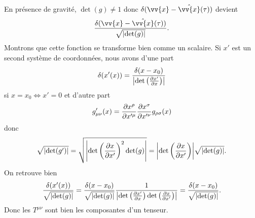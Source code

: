 \documentclass[a4paper,11pt]{report}
\begin{document}
\begin{exmp}
                En présence de gravité, $\det(g)\neq 1$ donc $\delta(\vv{x}-\hat{\vv{x}}(\tau))$ devient
                \begin{equation} \frac{\delta(\vv{x}-\hat{\vv{x}}(\tau))}{\sqrt{\abs{\det(g)}}}.
                \end{equation}
                Montrons que cette fonction se transforme bien comme un scalaire. Si $x'$ est un second système de coordonnées, nous avons d'une part
                \begin{equation}
                    \delta(x'(x)) = \frac{\delta(x-x_0)}{\abs{\det\left( \pdv{x'}{x} \right)}}
                \end{equation}
                si $x = x_0\Leftrightarrow x' = 0$ et d'autre part
                \begin{equation}
                    g'_{\mu\nu}(x) = \pdv{x^\rho}{x'^\mu}\pdv{x^\sigma}{x'^\nu} g_{\rho\sigma}(x)
                \end{equation}
                donc
                \begin{equation}
                    \sqrt{\abs{\det(g')}} = \sqrt{\abs{\det\left( \pdv{x}{x'}\right)^2 \det(g)}} = \abs{\det\left(\pdv{x}{x'}\right)} \sqrt{\abs{\det(g)}}.
                \end{equation}
                On retrouve bien
                \begin{equation}
                    \frac{\delta(x'(x))}{\sqrt{\abs{\det(g)}}} = \frac{\delta(x-x_0)}{\sqrt{\abs{\det(g)}}}\frac{1}{\abs{\det\left( \pdv{x'}{x}\right)\det\left( \pdv{x}{x'}\right)}} = \frac{\delta(x-x_0)}{\sqrt{\abs{\det(g)}}}.
                \end{equation}
                Donc les $T^{\mu\nu}$ sont bien les composantes d'un tenseur.
            \end{exmp}
            
\end{document}
